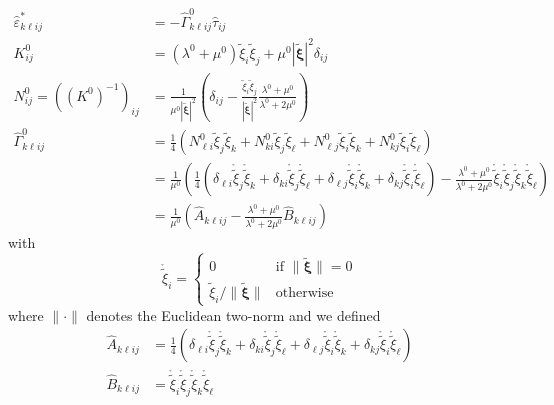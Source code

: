 \documentclass[11pt]{article}
\renewcommand{\vec}[1]{\boldsymbol{#1}}
\begin{document}
\begin{equation}
    \begin{aligned}
\widehat{\varepsilon}^*_{k\ell ij} &= -\widehat{\Gamma}^0_{k\ell ij} \widehat{\tau}_{ij}\\
K^0_{ij} &= (\lambda^0+\mu^0)\widetilde{\xi}_i\widetilde{\xi}_j + \mu^0 |\widetilde{\vec{\xi}}|^2 \delta_{ij}\\
N^0_{ij} =\left((K^0)^{-1}\right)_{ij} &= \frac{1}{\mu^0 |\widetilde{\vec{\xi}}|^2}\left(\delta_{ij}-\frac{\widetilde{\xi}_i\widetilde{\xi}_j}{|\widetilde{\vec{\xi}}|^2}\frac{\lambda^0+\mu^0}{\lambda^0+2\mu^0}\right)\\
\widehat{\Gamma}^0_{k\ell ij} &= \frac{1}{4}\left(N^0_{\ell i}\widetilde{\xi}_j\widetilde{\xi}_k+N^0_{k i}\widetilde{\xi}_j\widetilde{\xi}_\ell + N^0_{\ell j}\widetilde{\xi}_i\widetilde{\xi}_k+N^0_{kj}\widetilde{\xi}_i\widetilde{\xi}_\ell\right)\\
&= \frac{1}{\mu^0}\left(\frac{1}{4}\left(\delta_{\ell i} \mathring{\widetilde{\xi}}_j\mathring{\widetilde{\xi}}_k+\delta_{ki} \mathring{\widetilde{\xi}}_j\mathring{\widetilde{\xi}}_\ell+\delta_{\ell j} \mathring{\widetilde{\xi}}_i\mathring{\widetilde{\xi}}_k+\delta_{k j} \mathring{\widetilde{\xi}}_i\mathring{\widetilde{\xi}}_\ell\right)-\frac{\lambda^0+\mu^0}{\lambda^0+2\mu^0}\mathring{\widetilde{\xi}}_i\mathring{\widetilde{\xi}}_j\mathring{\widetilde{\xi}}_k\mathring{\widetilde{\xi}}_\ell\right)\\
&= \frac{1}{\mu^0}\left( \widehat{A}_{k\ell ij} - \frac{\lambda^0+\mu^0}{\lambda^0+2\mu^0} \widehat{B}_{k\ell ij}\right)
    \end{aligned}\label{eqn:fourier_expression}
\end{equation}
with
\begin{equation}
\mathring{\widetilde{\xi}}_i = \begin{cases}
0 & \text{if $\|\widetilde{\vec{\xi}}\|=0$}\\
\widetilde{\xi}_i/\|\widetilde{\vec{\xi}}\| & \text{otherwise}
\end{cases}
\end{equation}
where $\|\cdot\|$ denotes the Euclidean two-norm and we defined
\begin{equation}
\begin{aligned}
\widehat{A}_{k\ell ij} &= \frac{1}{4}\left(\delta_{\ell i} \mathring{\widetilde{\xi}}_j\mathring{\widetilde{\xi}}_k+\delta_{ki} \mathring{\widetilde{\xi}}_j\mathring{\widetilde{\xi}}_\ell+\delta_{\ell j} \mathring{\widetilde{\xi}}_i\mathring{\widetilde{\xi}}_k+\delta_{k j} \mathring{\widetilde{\xi}}_i\mathring{\widetilde{\xi}}_\ell\right)\\
\widehat{B}_{k\ell ij} &= \mathring{\widetilde{\xi}}_i\mathring{\widetilde{\xi}}_j\mathring{\widetilde{\xi}}_k\mathring{\widetilde{\xi}}_\ell
\end{aligned}
\end{equation}
\end{document}

